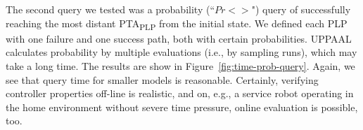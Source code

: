 \documentclass[letterpaper]{article}
\newcommand{\frameImage}[4]{
\begin{figure}[H] 
  \centerline{
    \fcolorbox{frameColor}{white}{
        \texttt{[image: \#1]} } }
    \caption{#4}
    \label{fig:#1}
\end{figure}
}
\begin{document}
The second query we tested was a probability (``$Pr<>$") query of successfully reaching the most distant PTA\textsubscript{PLP} from the initial state. We defined each PLP with one failure and one success path, both with certain probabilities. UPPAAL calculates probability by multiple evaluations (i.e., by sampling runs), which may take a long time.
%
%
%
%
%
The results are show in Figure~\ref{fig:time-prob-query}. %
Again, we see that query time for smaller models is reasonable. Certainly, verifying controller properties off-line is realistic, and on, e.g., a service robot operating in the home environment without severe time pressure, online evaluation is possible, too.


\end{document}

